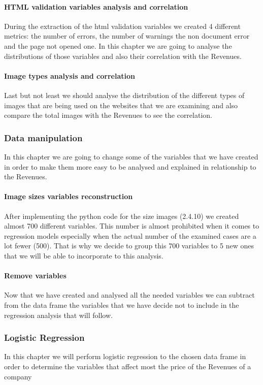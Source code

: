 \documentclass{article}
\begin{document}
\paragraph{HTML validation variables analysis and correlation}
During the extraction of the html validation variables we created 4 different metrics: the number of errors, the number of warnings the non document error and the page not opened one. In this chapter we are going to analyse the distributions of those variables and also their correlation with the Revenues.
\paragraph{Image types analysis and correlation}
Last but not least we should analyse the distribution of the different types of images that are being used on the websites that we are examining and also compare the total images with the Revenues to see the correlation.
\subsubsection{Data manipulation}
In this chapter we are going to change some of the variables that we have created in order to make them more easy to be analysed and explained in relationship to the Revenues. 
\paragraph{Image sizes variables reconstruction}
After implementing the python code for the size images (2.4.10) we created almost 700 different variables. This number is almost prohibited when it comes to regression models especially when the actual number of the examined cases are a lot fewer (500). That is why we decide to group this 700 variables to 5 new ones that we will be able to incorporate to this analysis.
\paragraph{Remove variables}
Now that we have created and analysed all the needed variables we can subtract from the data frame the variables that we have decide not to include in the regression analysis that will follow.
\subsubsection{Logistic Regression}
In this chapter we will perform logistic regression to the chosen data frame in order to determine the variables that affect most the price of the Revenues of a company
\end{document}
